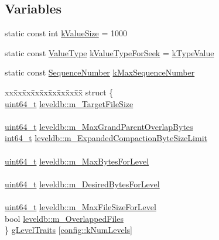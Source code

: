 \subsection*{Variables}
\begin{DoxyCompactItemize}
\item 
static const int \hyperlink{namespaceleveldb_a193cc831a2200dd1c5e6aee70d6654d3}{k\+Value\+Size} = 1000
\item 
static const \hyperlink{namespaceleveldb_acc038cb0d608414730cafa459a4ba866}{Value\+Type} \hyperlink{namespaceleveldb_a0b7840e7de67fb0f7905955c02f75cfa}{k\+Value\+Type\+For\+Seek} = \hyperlink{namespaceleveldb_acc038cb0d608414730cafa459a4ba866a97725c1d8e3317d1bac1f3b14fbfa281}{k\+Type\+Value}
\item 
static const \hyperlink{namespaceleveldb_a5481ededd221c36d652c371249f869fa}{Sequence\+Number} \hyperlink{namespaceleveldb_adf59027c8c0dcc54c9d8c3e5ba090463}{k\+Max\+Sequence\+Number}
\item 
\begin{tabbing}
xx\=xx\=xx\=xx\=xx\=xx\=xx\=xx\=xx\=\kill
struct \{\\
\>\hyperlink{stdint_8h_aaa5d1cd013383c889537491c3cfd9aad}{uint64\_t} \hyperlink{namespaceleveldb_a6f54381cb4b8cf99f4deebc5a2f91f75}{leveldb::m\_TargetFileSize}\\
\>\\
\>\hyperlink{stdint_8h_aaa5d1cd013383c889537491c3cfd9aad}{uint64\_t} \hyperlink{namespaceleveldb_a15f0b81fa1f74b097cb3a001124d9ca0}{leveldb::m\_MaxGrandParentOverlapBytes}\\
\>\hyperlink{stdint_8h_adec1df1b8b51cb32b77e5b86fff46471}{int64\_t} \hyperlink{namespaceleveldb_a1b6fb99eed946ea4c627c53c92422372}{leveldb::m\_ExpandedCompactionByteSizeLimit}\\
\>\\
\>\hyperlink{stdint_8h_aaa5d1cd013383c889537491c3cfd9aad}{uint64\_t} \hyperlink{namespaceleveldb_ac943033c07b0c2c7dbc7489454809f28}{leveldb::m\_MaxBytesForLevel}\\
\>\\
\>\hyperlink{stdint_8h_aaa5d1cd013383c889537491c3cfd9aad}{uint64\_t} \hyperlink{namespaceleveldb_aca00621293e009e8cf12635c6f6529a0}{leveldb::m\_DesiredBytesForLevel}\\
\>\\
\>\hyperlink{stdint_8h_aaa5d1cd013383c889537491c3cfd9aad}{uint64\_t} \hyperlink{namespaceleveldb_aecf106e2eaa567faeb35408f7382e1a0}{leveldb::m\_MaxFileSizeForLevel}\\
\>bool \hyperlink{namespaceleveldb_a5e31b908777c34e60340051e3d6b9bda}{leveldb::m\_OverlappedFiles}\\
\} \hyperlink{namespaceleveldb_a97a8ea9d8174264acb8c1cb5f183d8df}{gLevelTraits} \mbox{[}\hyperlink{namespaceleveldb_1_1config_ab6017947ae68898c606643bddc0f5b9c}{config::kNumLevels}\mbox{]}\\


\end{tabbing}
\end{DoxyCompactItemize}
